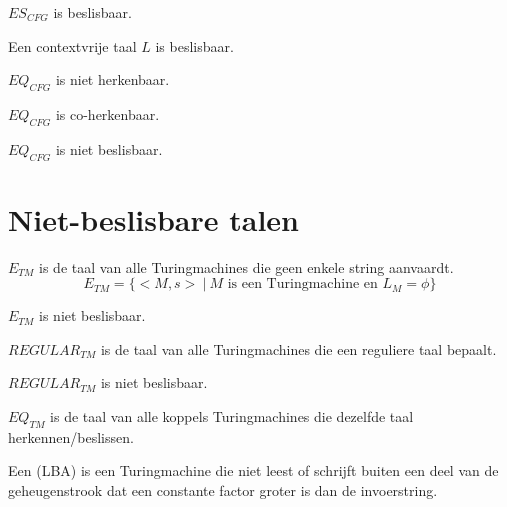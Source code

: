 \documentclass[main.tex]{subfiles}
\begin{document}
\begin{st}
  $ES_{CFG}$ is beslisbaar.
\end{st}

\begin{st}
  Een contextvrije taal $L$ is beslisbaar.
\end{st}

\begin{st}
  $EQ_{CFG}$ is niet herkenbaar.
\end{st}

\begin{st}
  $EQ_{CFG}$ is co-herkenbaar.
\end{st}

\begin{gev}
  $EQ_{CFG}$ is niet beslisbaar.
\end{gev}

\section{Niet-beslisbare talen}
\label{sec:niet-besl-talen}

\begin{de}
  $E_{TM}$ is de taal van alle Turingmachines die geen enkele string aanvaardt.
  \[ E_{TM} = \{ <M,s>\ |\ M \text{ is een Turingmachine en } L_{M} = \phi \} \]
\end{de}

\begin{st}
  $E_{TM}$ is niet beslisbaar.
\end{st}

\begin{de}
  $REGULAR_{TM}$ is de taal van alle Turingmachines die een reguliere taal bepaalt.
\end{de}

\begin{st}
  $REGULAR_{TM}$ is niet beslisbaar.
\end{st}

\begin{de}
  $EQ_{TM}$ is de taal van alle koppels Turingmachines die dezelfde taal herkennen/beslissen.
\end{de}

\begin{de}
  Een  (LBA) is een Turingmachine die niet leest of schrijft buiten een deel van de geheugenstrook dat een constante factor groter is dan de invoerstring.
\end{de}
\end{document}
